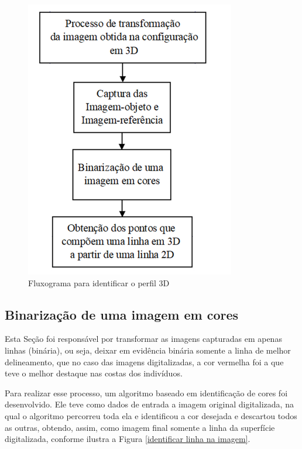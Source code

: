 \documentclass[a4paper, 12pt]{article}
\begin{document}
\begin{figure}[H]
	\centering
		\includegraphics[scale=0.5]{fluxograma_identificar_3D.png}
	\caption{Fluxograma para identificar o perfil 3D}
	\label{fluxograma_identificar_3D}
\end{figure}

\subsection{Binarização de uma imagem em cores}

Esta Seção foi responsável por transformar as imagens capturadas em apenas linhas (binária), ou seja, deixar em evidência binária somente a linha de melhor delineamento, que no caso das imagens digitalizadas, a cor vermelha foi a que teve o melhor destaque nas costas dos indivíduos.

Para realizar esse processo, um algoritmo baseado em identificação de cores foi desenvolvido. Ele teve como dados de entrada a imagem original digitalizada, na qual o algoritmo percorreu toda ela e identificou a cor desejada e descartou todos as outras, obtendo, assim, como imagem final somente a linha da superfície digitalizada, conforme ilustra a Figura \ref{identificar linha na imagem}.
\end{document}
